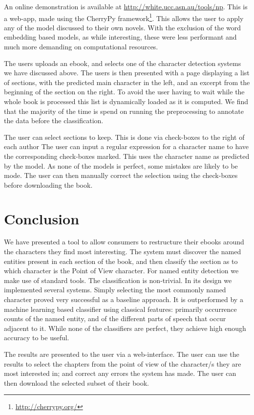 \documentclass[11pt,a4paper]{article}
\begin{document}
An online demonstration is available at \url{http://white.ucc.asn.au/tools/np}.
This is a web-app, made using the CherryPy framework\footnote{\url{http://cherrypy.org/}}.
This allows the user to apply any of the model discussed to their own novels.
With the exclusion of the word embedding based models, as while interesting, these were less performant and much more demanding on computational resources.


The users uploads an ebook, and selects one of the character detection systems we have discussed above.
The users is then presented with a page displaying a list of sections,
with the predicted main character in the left, and an excerpt from the beginning of the section on the right.
To avoid the user having to wait while the whole book is processed this list is dynamically loaded as it is computed.
We find that the majority of the time is spend on running the preprocessing to annotate the data before the classification.

The user can select sections to keep.
This is done via check-boxes to the right of each author
The user can input a regular expression for a character name to have the corresponding check-boxes marked.
This uses the character name as predicted by the model.
As none of the models is perfect, some mistakes are likely to be mode.
The user can then manually correct the selection using the check-boxes before downloading the book.




\section{Conclusion}\label{sec:conclusion}
We have presented a tool to allow consumers to restructure their ebooks around the characters they find most interesting.
The system must discover the named entities present in each section of the book,
and then classify the section as to which character is the Point of View character.
For named entity detection we make use of standard tools.
The classification is non-trivial.
In its design we implemented several systems.
Simply selecting the most commonly named character proved very successful as a baseline approach.
It is outperformed by a machine learning based classifier using classical features: primarily occurrence counts of the named entity, and of the different parts of speech that occur adjacent to it.
While none of the classifiers are perfect,
they achieve high enough accuracy to be useful.

The results are presented to the user via a web-interface.
The user can use the results to select the chapters from the point of view of the character/s they are most interested in;
and correct any errors the system has made.
The user can then download the selected subset of their book.
\end{document}
